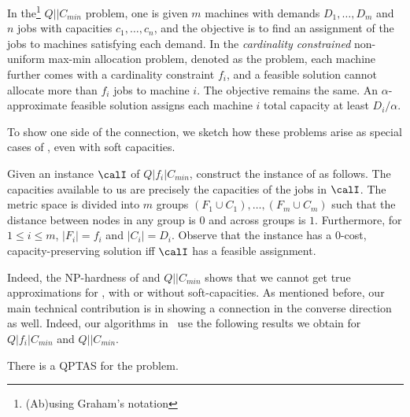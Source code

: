 \begin{definition}
In the\footnote{(Ab)using Graham's notation} $Q||C_{min}$ problem, one is given $m$ machines with demands $D_1,\ldots,D_m$ and $n$ jobs with capacities $c_1,\ldots,c_n$,
and the objective is to find an assignment of the jobs to machines satisfying each demand.
In the {\em cardinality constrained}  non-uniform max-min allocation problem, denoted as the \cckp problem, each machine further comes with a cardinality constraint $f_i$, and a feasible solution cannot allocate more than $f_i$ jobs to machine $i$. The objective remains the same. An $\alpha$-approximate feasible solution assigns each machine $i$  total capacity at least $ D_i/\alpha$.
\end{definition}
\noindent

To show one side of the connection, we sketch how these problems arise as special cases
of \mckc, even with soft capacities.
\begin{remark}\label{rem:cckp}
	Given an instance $\calI$ of $Q|f_i|C_{min}$, construct the instance of \mckc as follows. The capacities available to us are precisely the capacities of the jobs in $\calI$. The metric space is divided into $m$ groups $(F_1\cup C_1),\ldots,(F_m\cup C_m)$ such that the distance between nodes in any group is $0$ and across groups is $1$. Furthermore, for $1\leq i\leq m$, $|F_i| = f_i$ and $|C_i| = D_i$. Observe that the \mckc instance has a $0$-cost, capacity-preserving solution iff $\calI$ has a feasible assignment.
\end{remark}

Indeed, the NP-hardness of \cckp and $Q || C_{min}$ shows that we cannot get true approximations for \mckc, with or without soft-capacities.
As mentioned before, our main technical contribution is in showing a connection in the converse direction as well. Indeed, our algorithms in~ use the following results we obtain for $Q|f_i|C_{min}$ and $Q||C_{min}$.

\begin{theorem}\label{thm:q}
	There is a QPTAS for the \cckp problem.
\end{theorem}


